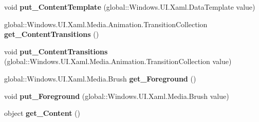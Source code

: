 \begin{DoxyCompactItemize}
\item 
\mbox{\label{interface_windows_1_1_u_i_1_1_xaml_1_1_controls_1_1_i_content_presenter_a74180212284ee21c083ea156f117cb3c}} 
void {\bfseries put\+\_\+\+Content\+Template} (global\+::\+Windows.\+U\+I.\+Xaml.\+Data\+Template value)
\item 
\mbox{\label{interface_windows_1_1_u_i_1_1_xaml_1_1_controls_1_1_i_content_presenter_a0db45f8a30518615e50e4f98e8bcc040}} 
global\+::\+Windows.\+U\+I.\+Xaml.\+Media.\+Animation.\+Transition\+Collection {\bfseries get\+\_\+\+Content\+Transitions} ()
\item 
\mbox{\label{interface_windows_1_1_u_i_1_1_xaml_1_1_controls_1_1_i_content_presenter_af8f3017b639541ee85c82042f3186506}} 
void {\bfseries put\+\_\+\+Content\+Transitions} (global\+::\+Windows.\+U\+I.\+Xaml.\+Media.\+Animation.\+Transition\+Collection value)
\item 
\mbox{\label{interface_windows_1_1_u_i_1_1_xaml_1_1_controls_1_1_i_content_presenter_a95c7018f0564a23c7ab641c21ab2cf47}} 
global\+::\+Windows.\+U\+I.\+Xaml.\+Media.\+Brush {\bfseries get\+\_\+\+Foreground} ()
\item 
\mbox{\label{interface_windows_1_1_u_i_1_1_xaml_1_1_controls_1_1_i_content_presenter_a77229ce3c46ba5f9ecb3fbe3361e9c0a}} 
void {\bfseries put\+\_\+\+Foreground} (global\+::\+Windows.\+U\+I.\+Xaml.\+Media.\+Brush value)
\item 
\mbox{\label{interface_windows_1_1_u_i_1_1_xaml_1_1_controls_1_1_i_content_presenter_ae239eb9dcb8ffce9b1af514ec96d232c}} 
object {\bfseries get\+\_\+\+Content} ()
\item 
\mbox{\label{interface_windows_1_1_u_i_1_1_xaml_1_1_controls_1_1_i_content_presenter_a92a8239bd5d9c2deaf3a6901d4c33da6}} 

\end{DoxyCompactItemize}
